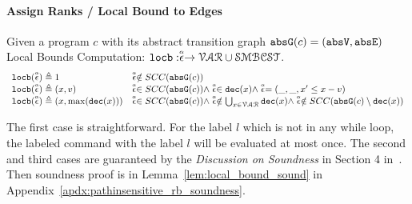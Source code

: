 \paragraph*{Assign Ranks / Local Bound to Edges}
\begin{defn}
  \label{def:lbgen}
Given a program $c$ with its abstract transition graph 
$\absG(c) = (\absV, \absE)$
\\
Local Bounds Computation:
$\locbound: \absevent \to \mathcal{VAR} \cup \constdom$.
%
\[ 
\begin{array}{ll}
  \locbound(\absevent) \triangleq 1 
  & \absevent \notin SCC(\absG(c))
  \\
  \locbound(\absevent) \triangleq (x, v) 
  & \absevent \in SCC(\absG(c)) \land \absevent \in \dec(x) \land  \absevent = (\_, \_ , x' \leq x - v) \\
  \locbound(\absevent) \triangleq (x, \max(\dec(x))) 
  & \absevent \in SCC(\absG(c)) \land 
  \absevent  \notin \bigcup_{x \in \mathcal{VAR}} \dec(x)
  \land \absevent \notin SCC(\absG(c) \setminus \dec(x)) 
\end{array}
  \]
\end{defn}
  The first case is straightforward. 
  For the label $l$ which is not in any while loop, 
  the labeled command with the label $l$ will be 
  evaluated at most once. 
  The second and third cases are guaranteed by the \emph{Discussion on Soundness} in Section 4 in~\cite{sinn2017complexity}.
  Then soundness proof is in Lemma~\ref{lem:local_bound_sound} in Appendix~\ref{apdx:pathinsensitive_rb_soundness}.
%
